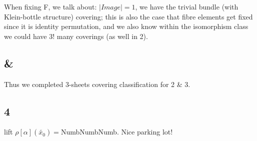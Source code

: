 \documentclass[11pt]{article}
\theoremstyle{remark}
\begin{document}
    When fixing F, we talk about: $|Image|=1$, we have the trivial bundle (with Klein-bottle structure) covering; this is also the case that fibre elements get fixed since it is identity permutation, and we also know within the isomorphism class we could have $3!$ many coverings (as well in 2).  
    
\subsection*{ & }     
    Thus we completed 3-sheets covering classification for 2 & 3.
\subsection*{4}
    lift $\rho{[\alpha]}(\tilde{x_0})=$NumbNumbNumb. Nice parking lot! 
\end{document}
